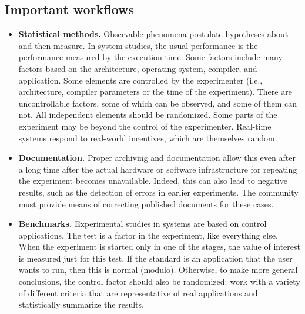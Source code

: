\documentclass{vldb}
\begin{document}
\subsection{Important workflows}
\begin{itemize}
    \item \textbf{Statistical methods.} Observable phenomena postulate hypotheses about and then measure. In system studies, the usual performance is the performance measured by the execution time. Some factors include many factors based on the architecture, operating system, compiler, and application. Some elements are controlled by the experimenter (i.e., architecture, compiler parameters or the time of the experiment). There are uncontrollable factors, some of which can be observed, and some of them can not. All independent elements should be randomized. Some parts of the experiment may be beyond the control of the experimenter. Real-time systems respond to real-world incentives, which are themselves random.
    \item \textbf{Documentation.} Proper archiving and documentation allow this even after a long time after the actual hardware or software infrastructure for repeating the experiment becomes unavailable. Indeed, this can also lead to negative results, such as the detection of errors in earlier experiments. The community must provide means of correcting published documents for these cases.
    \item \textbf{Benchmarks.} Experimental studies in systems are based on control applications. The test is a factor in the experiment, like everything else. When the experiment is started only in one of the stages, the value of interest is measured just for this test. If the standard is an application that the user wants to run, then this is normal (modulo). Otherwise, to make more general conclusions, the control factor should also be randomized: work with a variety of different criteria that are representative of real applications and statistically summarize the results.
\end{itemize}
\end{document}
